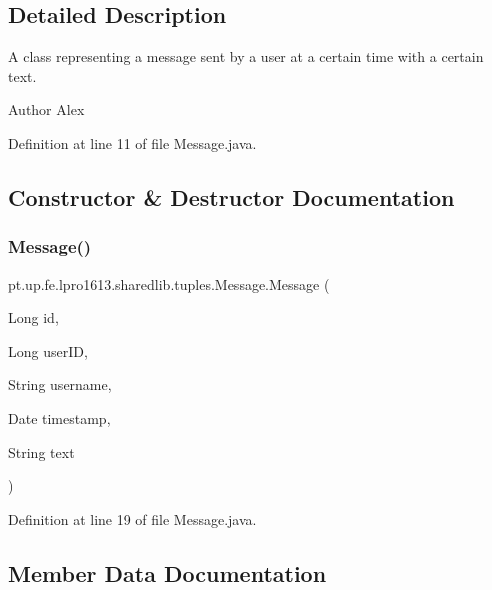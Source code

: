 \subsection{Detailed Description}
A class representing a message sent by a user at a certain time with a certain text.

\begin{DoxyAuthor}{Author}
Alex 
\end{DoxyAuthor}


Definition at line 11 of file Message.\+java.



\subsection{Constructor \& Destructor Documentation}
\hypertarget{classpt_1_1up_1_1fe_1_1lpro1613_1_1sharedlib_1_1tuples_1_1_message_ab2ae4e8f872aafb67a761c8769ad98a8}{}\label{classpt_1_1up_1_1fe_1_1lpro1613_1_1sharedlib_1_1tuples_1_1_message_ab2ae4e8f872aafb67a761c8769ad98a8} 
\subsubsection{\texorpdfstring{Message()}{Message()}}
{\footnotesize\ttfamily pt.\+up.\+fe.\+lpro1613.\+sharedlib.\+tuples.\+Message.\+Message (\begin{DoxyParamCaption}\item[{Long}]{id,  }\item[{Long}]{user\+ID,  }\item[{String}]{username,  }\item[{Date}]{timestamp,  }\item[{String}]{text }\end{DoxyParamCaption})}



Definition at line 19 of file Message.\+java.



\subsection{Member Data Documentation}
\hypertarget{classpt_1_1up_1_1fe_1_1lpro1613_1_1sharedlib_1_1tuples_1_1_message_ae18cf9c800010d876ac8b4a6926c068a}{}\label{classpt_1_1up_1_1fe_1_1lpro1613_1_1sharedlib_1_1tuples_1_1_message_ae18cf9c800010d876ac8b4a6926c068a} 
